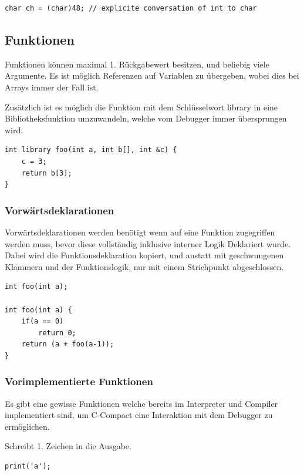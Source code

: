 \begin{lstlisting}[language=CMM]
char ch = (char)48; // explicite conversation of int to char
\end{lstlisting}

\subsection{Funktionen}

Funktionen k\"onnen maximal 1. R\"uckgabewert besitzen, und beliebig viele Argumente. Es ist m\"oglich Referenzen auf Variablen zu \"ubergeben, wobei dies bei Arrays immer der Fall ist.

Zus\"atzlich ist es m\"oglich die Funktion mit dem Schl\"usselwort library in eine Bibliotheksfunktion umzuwandeln, welche vom Debugger immer \"ubersprungen wird.

\begin{lstlisting}[language=CMM]
int library foo(int a, int b[], int &c) {
	c = 3;
	return b[3];
}
\end{lstlisting}

\subsubsection{Vorw\"artsdeklarationen}

Vorw\"artsdeklarationen werden ben\"otigt wenn auf eine Funktion zugegriffen werden muss, bevor diese vollst\"andig inklusive interner Logik Deklariert wurde. Dabei wird die Funktionsdeklaration kopiert, und anstatt mit geschwungenen Klammern und der Funktionslogik, nur mit einem Strichpunkt abgeschlossen.

\begin{lstlisting}[language=CMM]
int foo(int a);

int foo(int a) {
	if(a == 0)
		return 0;
	return (a + foo(a-1));
}
\end{lstlisting}

\subsubsection{Vorimplementierte Funktionen}

Es gibt eine gewisse Funktionen welche bereits im Interpreter und Compiler implementiert sind, um C-Compact eine Interaktion mit dem Debugger zu erm\"oglichen.


Schreibt 1. Zeichen in die Ausgabe. 

\begin{lstlisting}[language=CMM]
print('a');
\end{lstlisting}

